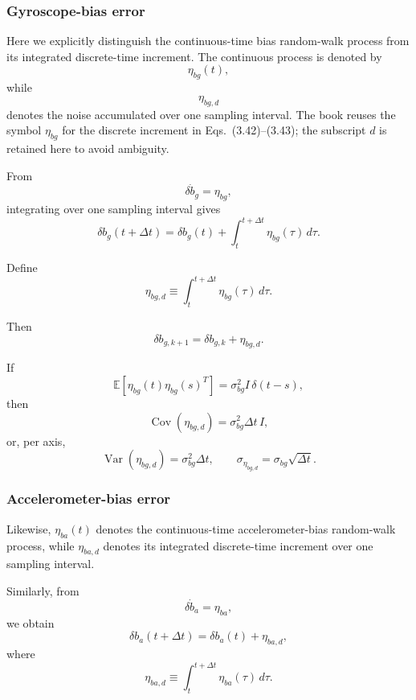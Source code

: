 \documentclass[11pt]{article}
\numberwithin{equation}{section}
\begin{document}
\subsubsection*{Gyroscope-bias error}

Here we explicitly distinguish the continuous-time bias random-walk
process from its integrated discrete-time increment.  The continuous
process is denoted by
\[
\eta_{bg}(t),
\]
while
\[
\eta_{bg,d}
\]
denotes the noise accumulated over one sampling interval.  The book
reuses the symbol $\eta_{bg}$ for the discrete increment in
Eqs.~(3.42)--(3.43); the subscript $d$ is retained here to avoid
ambiguity.

From
\[
\delta\dot b_g=\eta_{bg},
\]
integrating over one sampling interval gives
\[
\delta b_g(t+\Delta t)
=
\delta b_g(t)
+
\int_t^{t+\Delta t}\eta_{bg}(\tau)\,d\tau.
\]

Define
\begin{equation}
\boxed{
\eta_{bg,d}
\equiv
\int_t^{t+\Delta t}\eta_{bg}(\tau)\,d\tau.
}
\end{equation}

Then
\begin{equation}
\boxed{
\delta b_{g,k+1}
=
\delta b_{g,k}+\eta_{bg,d}.
}
\end{equation}

If
\[
\mathbb{E}\!\left[
\eta_{bg}(t)\eta_{bg}(s)^T
\right]
=
\sigma_{bg}^2 I\,\delta(t-s),
\]
then
\begin{equation}
\boxed{
\operatorname{Cov}(\eta_{bg,d})
=
\sigma_{bg}^2\Delta t\,I,
}
\end{equation}
or, per axis,
\begin{equation}
\boxed{
\operatorname{Var}(\eta_{bg,d})
=
\sigma_{bg}^2\Delta t,
\qquad
\sigma_{\eta_{bg,d}}
=
\sigma_{bg}\sqrt{\Delta t}.
}
\end{equation}

\subsubsection*{Accelerometer-bias error}

Likewise, $\eta_{ba}(t)$ denotes the continuous-time accelerometer-bias
random-walk process, while $\eta_{ba,d}$ denotes its integrated
discrete-time increment over one sampling interval.

Similarly, from
\[
\delta\dot b_a=\eta_{ba},
\]
we obtain
\begin{equation}
\boxed{
\delta b_a(t+\Delta t)
=
\delta b_a(t)+\eta_{ba,d},
}
\end{equation}
where
\begin{equation}
\boxed{
\eta_{ba,d}
\equiv
\int_t^{t+\Delta t}\eta_{ba}(\tau)\,d\tau.
}
\end{equation}
\end{document}
